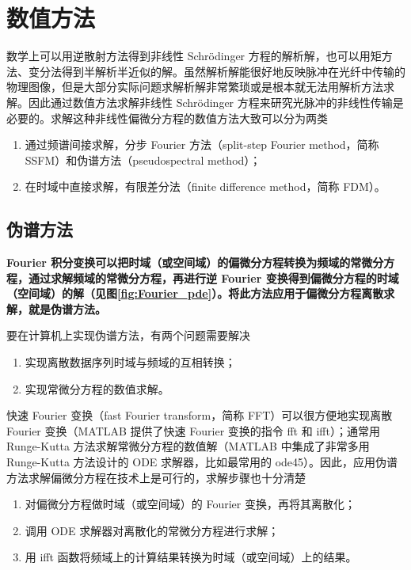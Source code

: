 \section{数值方法}
\label{sec:numerical}
数学上可以用逆散射方法得到非线性 Schr\"odinger 方程的解析解，也可以用矩方法、变分法得到半解析半近似的解。虽然解析解能很好地反映脉冲在光纤中传输的物理图像，但是大部分实际问题求解析解非常繁琐或是根本就无法用解析方法求解。因此通过数值方法求解非线性 Schr\"odinger 方程来研究光脉冲的非线性传输是必要的。求解这种非线性偏微分方程的数值方法大致可以分为两类
\begin{enumerate}[label=(\arabic*)]
    \item 通过频谱间接求解，分步 Fourier 方法（split-step Fourier method，简称 SSFM）和伪谱方法（pseudospectral method）；
    \item 在时域中直接求解，有限差分法（finite difference method，简称 FDM）。
\end{enumerate}
\subsection{伪谱方法}
{\bfseries Fourier 积分变换可以把时域（或空间域）的偏微分方程转换为频域的常微分方程，通过求解频域的常微分方程，再进行逆 Fourier 变换得到偏微分方程的时域（空间域）的解（见图\ref{fig:Fourier_pde}）。将此方法应用于偏微分方程离散求解，就是伪谱方法\cite{zhangxiao}。}

要在计算机上实现伪谱方法，有两个问题需要解决
\begin{enumerate}[label=(\arabic*)]
    \item 实现离散数据序列时域与频域的互相转换；
    \item 实现常微分方程的数值求解。
\end{enumerate}
快速 Fourier 变换（fast Fourier transform，简称 FFT）可以很方便地实现离散 Fourier 变换（MATLAB 提供了快速 Fourier 变换的指令 fft 和 ifft）；通常用 Runge-Kutta 方法求解常微分方程的数值解（MATLAB 中集成了非常多用 Runge-Kutta 方法设计的 ODE 求解器，比如最常用的 ode45）\cite{Anne}。因此，应用伪谱方法求解偏微分方程在技术上是可行的，求解步骤也十分清楚\cite{zhangxiao}
\begin{enumerate}[label=(\arabic*)]
    \item 对偏微分方程做时域（或空间域）的 Fourier 变换，再将其离散化；
    \item 调用 ODE 求解器对离散化的常微分方程进行求解；
    \item 用 ifft 函数将频域上的计算结果转换为时域（或空间域）上的结果。
\end{enumerate}

